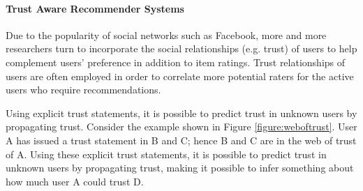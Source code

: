 

\paragraph{Trust Aware Recommender Systems}


Due to the popularity of social networks such as Facebook, more and more researchers turn to incorporate the social relationships (e.g. trust) of users to help complement users’ preference in addition to item ratings. Trust relationships of users are often employed in order to correlate more potential raters for the active users who require recommendations.

Using explicit trust statements, it is possible to predict trust in unknown users by propagating trust. Consider the example shown in Figure \ref{figure:weboftrust}. User A has issued a trust statement in B and C; hence B and C are in the web of trust of A. Using these explicit trust statements, it is possible to predict trust in unknown users by propagating trust, making it possible to infer something about how much user A could trust D.

